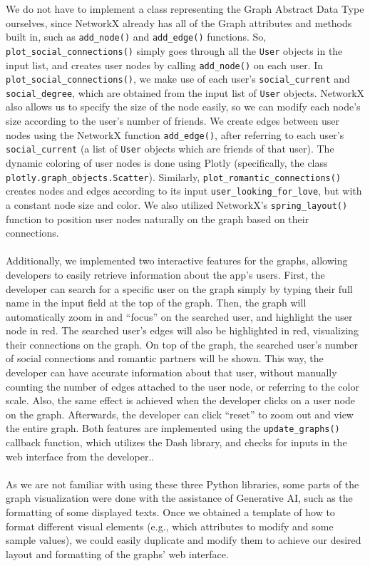 \documentclass[fontsize=11pt]{article}
\begin{document}
We do not have to implement a class representing the Graph Abstract Data Type ourselves, since NetworkX already has all of the Graph attributes and methods built in, such as \texttt{add\_node()} and \texttt{add\_edge()} functions.
So, \texttt{plot\_social\_connections()} simply goes through all the \texttt{User} objects in the input list, and creates user nodes by calling \texttt{add\_node()} on each user.
In \texttt{plot\_social\_connections()}, we make use of each user’s \texttt{social\_current} and \texttt{social\_degree}, which are obtained from the input list of \texttt{User} objects.
NetworkX also allows us to specify the size of the node easily, so we can modify each node’s size according to the user’s number of friends.
We create edges between user nodes using the NetworkX function \texttt{add\_edge()}, after referring to each user’s \texttt{social\_current} (a list of \texttt{User} objects which are friends of that user).
The dynamic coloring of user nodes is done using Plotly (specifically, the class \texttt{plotly.graph\_objects.Scatter}).
Similarly, \texttt{plot\_romantic\_connections()} creates nodes and edges according to its input \texttt{user\_looking\_for\_love}, but with a constant node size and color.
We also utilized NetworkX’s \texttt{spring\_layout()} function to position user nodes naturally on the graph based on their connections.
\\
\\
Additionally, we implemented two interactive features for the graphs, allowing developers to easily retrieve information about the app’s users.
First, the developer can search for a specific user on the graph simply by typing their full name in the input field at the top of the graph.
Then, the graph will automatically zoom in and ``focus” on the searched user, and highlight the user node in red.
The searched user’s edges will also be highlighted in red, visualizing their connections on the graph.
On top of the graph, the searched user’s number of social connections and romantic partners will be shown.
This way, the developer can have accurate information about that user, without manually counting the number of edges attached to the user node, or referring to the color scale.
Also, the same effect is achieved when the developer clicks on a user node on the graph.
Afterwards, the developer can click ``reset” to zoom out and view the entire graph.
Both features are implemented using the \texttt{update\_graphs()} callback function, which utilizes the Dash library, and checks for inputs in the web interface from the developer..
\\
\\
As we are not familiar with using these three Python libraries, some parts of the graph visualization were done with the assistance of Generative AI, such as the formatting of some displayed texts.
Once we obtained a template of how to format different visual elements (e.g., which attributes to modify and some sample values), we could easily duplicate and modify them to achieve our desired layout and formatting of the graphs’ web interface.
\end{document}

